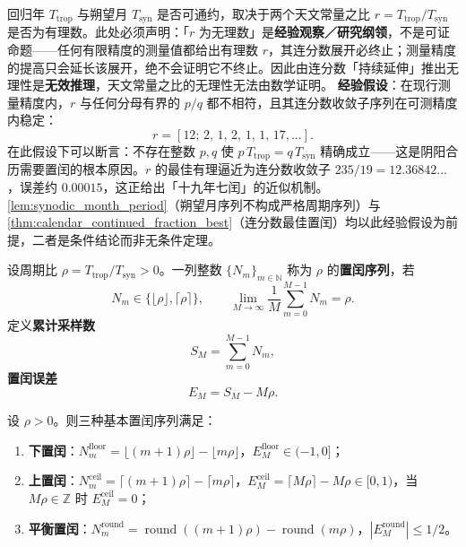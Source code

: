 \begin{remark}\label{prop:length_incommensurability}
回归年 \(T_{\text{trop}}\) 与朔望月 \(T_{\text{syn}}\) 是否可通约，取决于两个天文常量之比 \(r=T_{\text{trop}}/T_{\text{syn}}\) 是否为有理数。此处必须声明：「\(r\) 为无理数」是\textbf{经验观察／研究纲领}，不是可证命题——任何有限精度的测量值都给出有理数 \(r\)，其连分数展开必终止；测量精度的提高只会延长该展开，绝不会证明它不终止。因此由连分数「持续延伸」推出无理性是\textbf{无效推理}，天文常量之比的无理性无法由数学证明。
\textbf{经验假设}：在现行测量精度内，\(r\) 与任何分母有界的 \(p/q\) 都不相符，且其连分数收敛子序列在可测精度内稳定：
\[
r=[12;\,2,\,1,\,2,\,1,\,1,\,17,\ldots].
\]
在此假设下可以断言：不存在整数 \(p,q\) 使 \(p\,T_{\text{trop}}=q\,T_{\text{syn}}\) 精确成立——这是阴阳合历需要置闰的根本原因。\(r\) 的最佳有理逼近为连分数收敛子 \(235/19=12.36842\ldots\)，误差约 \(0.00015\)，这正给出「十九年七闰」的近似机制。
\cref{lem:synodic_month_period}（朔望月序列不构成严格周期序列）与 \cref{thm:calendar_continued_fraction_best}（连分数最佳置闰）均以此经验假设为前提，二者是条件结论而非无条件定理。
\end{remark}

\begin{definition}[置闰窗口与置闰序列]\label{def:calendar_intercalation}
设周期比 \(\rho=T_{\text{trop}}/T_{\text{syn}}>0\)。一列整数 \(\{N_m\}_{m\in\mathbb N}\) 称为 \(\rho\) 的\textbf{置闰序列}，若
\[
N_m\in\{\lfloor\rho\rfloor,\lceil\rho\rceil\},\qquad
\lim_{M\to\infty}\frac1M\sum_{m=0}^{M-1}N_m=\rho.
\]
定义\textbf{累计采样数}
\[
S_M=\sum_{m=0}^{M-1}N_m,
\]
\textbf{置闰误差}
\[
E_M=S_M-M\rho.
\]
\end{definition}

\begin{theorem}[置闰误差有界定理]\label{thm:calendar_intercalation_error_bound}
设 \(\rho>0\)。则三种基本置闰序列满足：
\begin{enumerate}[label=(\roman*)]
    \item \textbf{下置闰}：\(N_m^{\mathrm{floor}}=\lfloor (m+1)\rho\rfloor-\lfloor m\rho\rfloor\)，\(E_M^{\mathrm{floor}}\in(-1,0]\)；
    \item \textbf{上置闰}：\(N_m^{\mathrm{ceil}}=\lceil (m+1)\rho\rceil-\lceil m\rho\rceil\)，\(E_M^{\mathrm{ceil}}=\lceil M\rho\rceil-M\rho\in[0,1)\)，当 \(M\rho\in\mathbb Z\) 时 \(E_M^{\mathrm{ceil}}=0\)；
    \item \textbf{平衡置闰}：\(N_m^{\mathrm{round}}=\operatorname{round}((m+1)\rho)-\operatorname{round}(m\rho)\)，\(|E_M^{\mathrm{round}}|\le 1/2\)。
\end{enumerate}
\end{theorem}

